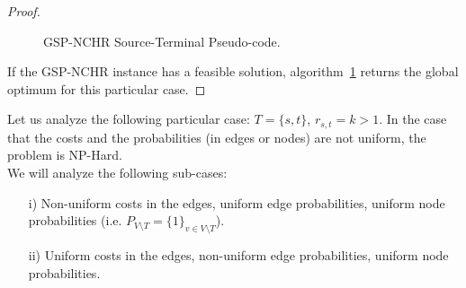 \begin{proof}
\begin{figure}[H]
\begin{center}
\end{center}
\caption{GSP-NCHR Source-Terminal Pseudo-code.}
\label{GSP-NCHR_fig}
\end{figure}

If the GSP-NCHR instance has a feasible solution, 
algorithm~\ref{GSP-NCHR_fig} returns the global optimum for this
particular case.

\end{proof}

\noindent Let us analyze the following particular case:
$T=\{s,t\}$, $r_{s,t}=k>1$. In the case that the costs and the
probabilities (in edges or nodes) are not uniform, the problem is
NP-Hard.\\

\noindent We will analyze the following sub-cases:
\begin{enumerate}
    \item[i)] Non-uniform costs in the edges, uniform edge
    probabilities, uniform node probabilities (i.e. $P_{V\setminus T}=\{1\}_{v\in V\setminus T}$).
    \item[ii)] Uniform costs in the edges, non-uniform edge
    probabilities, uniform node probabilities.
\end{enumerate}

